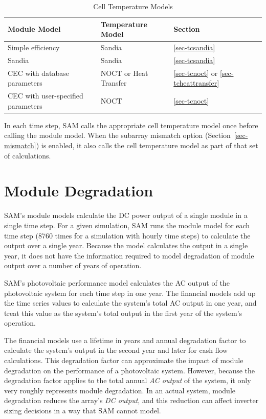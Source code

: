 \documentclass[12pt,letterpaper]{article}
\begin{document}
\begin{table}
\begin{center}
\caption{Cell Temperature Models}
\begin{tabular}{lll}
\midrule
Module Model & Temperature Model & Section\\
\midrule
Simple efficiency & Sandia & \ref{sec-tcsandia}\\
Sandia & Sandia & \ref{sec-tcsandia} \\
CEC with database parameters & NOCT or Heat Transfer & \ref{sec-tcnoct} or \ref{sec-tcheattransfer}\\
CEC with user-specified parameters & NOCT & \ref{sec-tcnoct}\\
\hline
\end{tabular}
\label{tab-tempcorr}
\end{center}
\end{table}

In each time step, SAM calls the appropriate cell temperature model once before calling the module model. When the subarray mismatch option (Section~\ref{sec-mismatch}) is enabled, it also calls the cell temperature model as part of that set of calculations.

\section{Module Degradation}

SAM's module models calculate the DC power output of a single module in a single time step. For a given simulation, SAM runs the module model for each time step (8760 times for a simulation with hourly time steps) to calculate the output over a single year. Because the model calculates the output in a single year, it does not have the information required to model degradation of module output over a number of years of operation.

SAM's photovoltaic performance model calculates the AC output of the photovoltaic system for each time step in one year. The financial models add up the time series values to calculate the system's total AC output in one year, and treat this value as the system's total output in the first year of the system's operation.

The financial models use a lifetime in years and annual degradation factor to calculate the system's output in the second year and later for cash flow calculations. This degradation factor can approximate the impact of module degradation on the performance of a photovoltaic system. However, because the degradation factor applies to the total annual \textit{AC output} of the system, it only very roughly represents module degradation. In an actual system, module degradation reduces the array's \textit{DC output}, and this reduction can affect inverter sizing decisions in a way that SAM cannot model.
\end{document}
